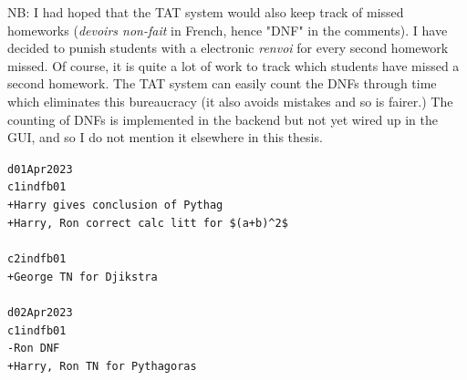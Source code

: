 \documentclass[10pt]{article}
\begin{document}
\begin{tcolorbox}
NB: I had hoped that the TAT system would also keep track of missed homeworks (\emph{devoirs non-fait} in French, hence "DNF" in the comments). I have decided to punish students with a electronic \emph{renvoi} for every second homework missed. Of course, it is quite a lot of work to track which students have missed a second homework. The TAT system can easily count the DNFs through time which eliminates this bureaucracy (it also avoids mistakes and so is fairer.) The counting of DNFs is implemented in the backend but not yet wired up in the GUI, and so I do not mention it elsewhere in this thesis.
\end{tcolorbox}

\begin{landscape}

\begin{tcolorbox}[title = comments\_file\_v1.1.txt]
\texttt{d01Apr2023\\c1indfb01\\+Harry gives conclusion of Pythag\\+Harry, Ron correct calc litt for \$(a+b)\textasciicircum2\$\\\\c2indfb01\\+George TN for Djikstra \\\\ d02Apr2023\\c1indfb01\\-Ron DNF\\+Harry, Ron TN for Pythagoras}
\end{tcolorbox}


\begin{tcolorbox}[title = comments\_table\_DataFrame $\subset$ progress\_table\_DataFrame] \label{comments_table}


\end{tcolorbox}
\end{landscape}
\end{document}
